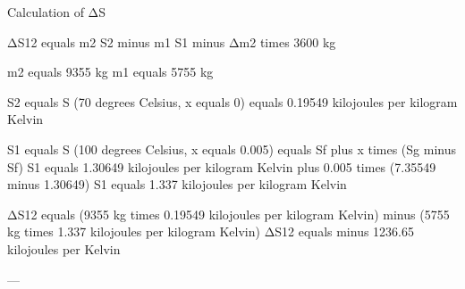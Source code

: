 Calculation of ΔS  

ΔS12 equals m2 S2 minus m1 S1 minus Δm2 times 3600 kg  

m2 equals 9355 kg  
m1 equals 5755 kg  

S2 equals S (70 degrees Celsius, x equals 0) equals 0.19549 kilojoules per kilogram Kelvin  

S1 equals S (100 degrees Celsius, x equals 0.005) equals Sf plus x times (Sg minus Sf)  
S1 equals 1.30649 kilojoules per kilogram Kelvin plus 0.005 times (7.35549 minus 1.30649)  
S1 equals 1.337 kilojoules per kilogram Kelvin  

ΔS12 equals (9355 kg times 0.19549 kilojoules per kilogram Kelvin) minus (5755 kg times 1.337 kilojoules per kilogram Kelvin)  
ΔS12 equals minus 1236.65 kilojoules per Kelvin  

---